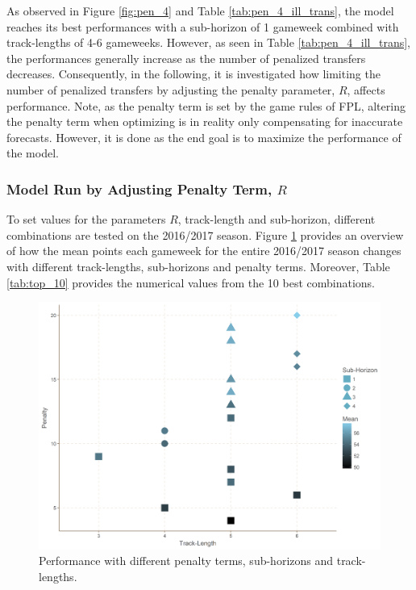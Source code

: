 \FloatBarrier

As observed in Figure \ref{fig:pen_4} and Table \ref{tab:pen_4_ill_trans}, the model reaches its best performances with a sub-horizon of 1 gameweek combined with track-lengths of 4-6 gameweeks. However, as seen in Table \ref{tab:pen_4_ill_trans}, the performances generally increase as the number of penalized transfers decreases. Consequently, in the following, it is investigated how limiting the number of penalized transfers by adjusting the penalty parameter, $R$, affects performance. Note, as the penalty term is set by the game rules of FPL, altering the penalty term when optimizing is in reality only compensating for inaccurate forecasts. However, it is done as the end goal is to maximize the performance of the model.

\newpar

\subsubsection{Model Run by Adjusting Penalty Term, $R$}

To set values for the parameters $R$, track-length and sub-horizon, different combinations are tested on the 2016/2017 season. Figure \ref{Parameter_choice} provides an overview of how the mean points each gameweek for the entire 2016/2017 season changes with different track-lengths, sub-horizons and penalty terms. Moreover, Table \ref{tab:top_10} provides the numerical values from the 10 best combinations.


\newpar


\begin{figure}[!htb]
    \centering
    \includegraphics[scale=0.4]{fig/chapter_6/paramter_choice.png}
    \caption{Performance with different penalty terms, sub-horizons and track-lengths.}
\label{Parameter_choice}    
\end{figure}

